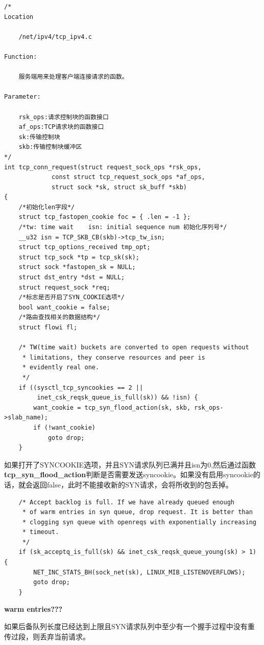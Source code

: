 \begin{verbatim}
/* 
Location

	/net/ipv4/tcp_ipv4.c

Function:

	服务端用来处理客户端连接请求的函数。

Parameter:

	rsk_ops:请求控制块的函数接口
	af_ops:TCP请求块的函数接口
	sk:传输控制块
	skb:传输控制块缓冲区
*/
int tcp_conn_request(struct request_sock_ops *rsk_ops,
             const struct tcp_request_sock_ops *af_ops,
             struct sock *sk, struct sk_buff *skb)
{
	/*初始化len字段*/
    struct tcp_fastopen_cookie foc = { .len = -1 };     
    /*tw: time wait    isn: initial sequence num 初始化序列号*/
	__u32 isn = TCP_SKB_CB(skb)->tcp_tw_isn;            
    struct tcp_options_received tmp_opt;
    struct tcp_sock *tp = tcp_sk(sk);
    struct sock *fastopen_sk = NULL;
    struct dst_entry *dst = NULL;
    struct request_sock *req;
	/*标志是否开启了SYN_COOKIE选项*/
    bool want_cookie = false;
	/*路由查找相关的数据结构*/ 
    struct flowi fl;                                   

    /* TW(time wait) buckets are converted to open requests without
     * limitations, they conserve resources and peer is
     * evidently real one.
     */
    if ((sysctl_tcp_syncookies == 2 ||
         inet_csk_reqsk_queue_is_full(sk)) && !isn) {
        want_cookie = tcp_syn_flood_action(sk, skb, rsk_ops->slab_name);
        if (!want_cookie)
            goto drop;
    }
\end{verbatim}
                如果打开了SYNCOOKIE选项，并且SYN请求队列已满并且isn为0,然后通过函数\textbf{tcp\_syn\_flood\_action}判断是否需要发送syncookie。如果没有启用syncookie的话，就会返回false，此时不能接收新的SYN请求，会将所收到的包丢掉。

\begin{verbatim}
    /* Accept backlog is full. If we have already queued enough
     * of warm entries in syn queue, drop request. It is better than
     * clogging syn queue with openreqs with exponentially increasing
     * timeout.
     */
    if (sk_acceptq_is_full(sk) && inet_csk_reqsk_queue_young(sk) > 1) {
        NET_INC_STATS_BH(sock_net(sk), LINUX_MIB_LISTENOVERFLOWS);
        goto drop;
    }
\end{verbatim}

        \textbf{warm entries???}               
        
        如果后备队列长度已经达到上限且SYN请求队列中至少有一个握手过程中没有重传过段，则丢弃当前请求。

